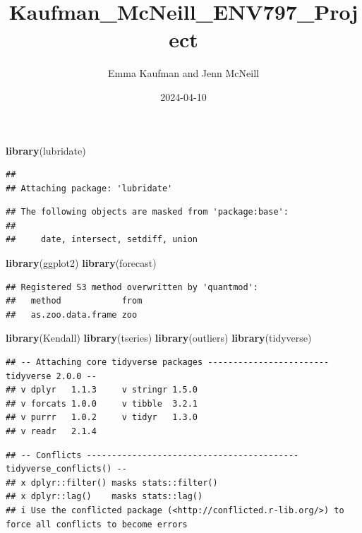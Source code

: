 \documentclass[
]{article}
\title{Kaufman\_McNeill\_ENV797\_Project}
\author{Emma Kaufman and Jenn McNeill}
\date{2024-04-10}
\newenvironment{Shaded}{\begin{snugshade}}{\end{snugshade}}
\newcommand{\FunctionTok}[1]{\textcolor[rgb]{0.13,0.29,0.53}{\textbf{#1}}}
\newcommand{\NormalTok}[1]{#1}
\begin{document}
\maketitle

\begin{Shaded}
\begin{Highlighting}[]
\FunctionTok{library}\NormalTok{(lubridate)}
\end{Highlighting}
\end{Shaded}

\begin{verbatim}
## 
## Attaching package: 'lubridate'
\end{verbatim}

\begin{verbatim}
## The following objects are masked from 'package:base':
## 
##     date, intersect, setdiff, union
\end{verbatim}

\begin{Shaded}
\begin{Highlighting}[]
\FunctionTok{library}\NormalTok{(ggplot2)}
\FunctionTok{library}\NormalTok{(forecast)  }
\end{Highlighting}
\end{Shaded}

\begin{verbatim}
## Registered S3 method overwritten by 'quantmod':
##   method            from
##   as.zoo.data.frame zoo
\end{verbatim}

\begin{Shaded}
\begin{Highlighting}[]
\FunctionTok{library}\NormalTok{(Kendall)}
\FunctionTok{library}\NormalTok{(tseries)}
\FunctionTok{library}\NormalTok{(outliers)}
\FunctionTok{library}\NormalTok{(tidyverse)}
\end{Highlighting}
\end{Shaded}

\begin{verbatim}
## -- Attaching core tidyverse packages ------------------------ tidyverse 2.0.0 --
## v dplyr   1.1.3     v stringr 1.5.0
## v forcats 1.0.0     v tibble  3.2.1
## v purrr   1.0.2     v tidyr   1.3.0
## v readr   2.1.4
\end{verbatim}

\begin{verbatim}
## -- Conflicts ------------------------------------------ tidyverse_conflicts() --
## x dplyr::filter() masks stats::filter()
## x dplyr::lag()    masks stats::lag()
## i Use the conflicted package (<http://conflicted.r-lib.org/>) to force all conflicts to become errors
\end{verbatim}
\end{document}
